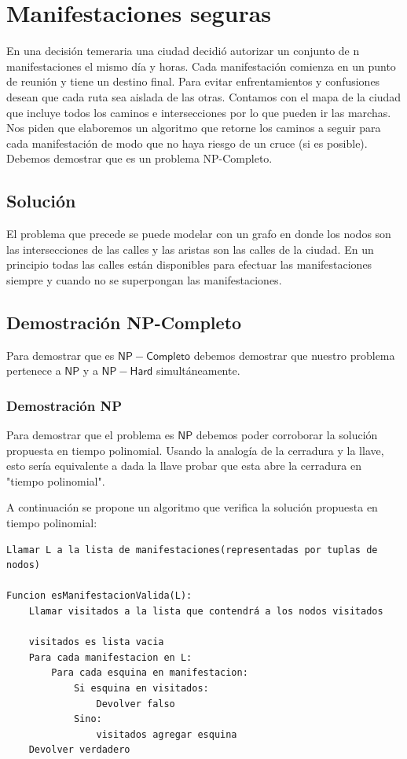  \section{Manifestaciones seguras}

En una decisión temeraria una ciudad decidió autorizar un conjunto de n manifestaciones el mismo día y horas. Cada manifestación comienza en un punto de reunión y tiene un destino final. Para evitar enfrentamientos y confusiones desean que cada ruta sea aislada de las otras. Contamos con el mapa de la ciudad que incluye todos los caminos e intersecciones por lo que pueden ir las marchas. Nos piden que elaboremos un algoritmo que retorne los caminos a seguir para cada manifestación de modo que no haya riesgo de un cruce (si es posible).\newline
Debemos demostrar que es un problema NP-Completo.

\subsection{Solución}
El problema que precede se puede modelar con un grafo en donde los nodos son las intersecciones de las calles y las aristas son las calles de la ciudad. En un principio todas las calles están disponibles para efectuar las manifestaciones siempre y cuando no se superpongan las manifestaciones.

\subsection{Demostración NP-Completo}
Para demostrar que es $\mathsf{NP-Completo}$ debemos demostrar que nuestro problema pertenece a $\mathsf{NP}$ y a $\mathsf{NP-Hard}$ simultáneamente.

\subsubsection{Demostración NP}
Para demostrar que el problema es $\mathsf{NP}$ debemos poder corroborar la solución propuesta en tiempo polinomial. Usando la analogía de la cerradura y la llave, esto sería equivalente a dada la llave probar que esta abre la cerradura en "tiempo polinomial". \newline

A continuación se propone un algoritmo que verifica la solución propuesta en tiempo polinomial:

\begin{verbatim}
Llamar L a la lista de manifestaciones(representadas por tuplas de nodos)

Funcion esManifestacionValida(L):
    Llamar visitados a la lista que contendrá a los nodos visitados
    
    visitados es lista vacia
    Para cada manifestacion en L:
        Para cada esquina en manifestacion:
            Si esquina en visitados:
                Devolver falso
            Sino:
                visitados agregar esquina
    Devolver verdadero
\end{verbatim}

